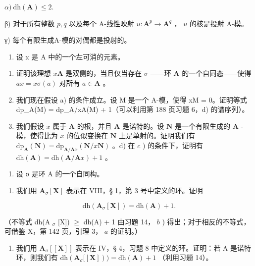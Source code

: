 \(\alpha)\ \mathrm{dh}(\mathbf{A}) \leqslant 2.\)

β) 对于所有整数 \(p, q\) 以及每个 A-线性映射 \(u: \mathbf{A}^p \to \mathbf{A}^q\) ， \(u\) 的核是投射 A-模。

γ) 每个有限生成A-模的对偶都是投射的。

\begin{enumerate}
\def\labelenumi{\arabic{enumi})}
\setcounter{enumi}{13}
\tightlist
\item
  设 x 是 A 中的一个左可消的元素。
\end{enumerate}

\begin{enumerate}
\def\labelenumi{\alph{enumi})}
\item
  证明该理想 \(x\mathbf{A}\) 是双侧的，当且仅当存在 \(\sigma\) ——环 \(\mathbf{A}\) 的一个自同态——使得 \(ax = x\sigma(a)\) 对所有 \(a \in \mathbf{A}\) 。
\item
  我们现在假设 a) 的条件成立。设 M 是一个 A-模，使得 xM = 0。证明等式 dp\_A(M) = dp\_{A/xA}(M) + 1（可以利用第 188 页习题 6，d) 的谱序列）。
\item
  我们假设 \(x\) 属于 \(\mathbf{A}\) 的根，并且 \(\mathbf{A}\) 是诺特的。设 \(\mathbf{N}\) 是一个有限生成的 \(\mathbf{A}\) -模，使得比为 \(x\) 的位似变换在 \(\mathbf{N}\) 上是单射的。证明我们有 \(\mathrm{dp}_{\mathbf{A}}(\mathbf{N}) = \mathrm{dp}_{\mathbf{A}/\mathbf{A}x}(\mathbf{N}/x\mathbf{N})\) 。d) 在 \(c\) ) 的条件下，证明有 \(\mathrm{dh}(\mathbf{A}) = \mathrm{dh}(\mathbf{A}/\mathbf{A}x) + 1\) 。
\end{enumerate}

\begin{enumerate}
\def\labelenumi{\arabic{enumi})}
\setcounter{enumi}{14}
\tightlist
\item
  设 σ 是环 A 的一个自同构。
\end{enumerate}

\begin{enumerate}
\def\labelenumi{\alph{enumi})}
\tightlist
\item
  我们用 \(\mathbf{A}_{\sigma}[\mathbf{X}]\) 表示在 VIII，§ 1，第 3 号中定义的环。证明
\end{enumerate}

\[
\mathrm{dh} (\mathbf {A} _ {\sigma} [ \mathbf {X} ]) = \mathrm{dh} (\mathbf {A}) + 1.
\]

（不等式 dh(A \(_{\sigma}\) {[}X{]}) \(\geqslant\) dh(A) + 1 由习题 14， \(b\) ) 得出；对于相反的不等式，可借鉴 X，第 142 页，引理 3， \(a\) 的证明。）

\begin{enumerate}
\def\labelenumi{\alph{enumi})}
\setcounter{enumi}{1}
\tightlist
\item
  我们用 \(\mathbf{A}_{\sigma}[[\mathbf{X}]]\) 表示在 IV，§ 4，习题 8 中定义的环。证明：若 A 是诺特环，则我们有 \(\mathrm{dh}(\mathbf{A}_{\sigma}[[\mathbf{X}]))=\mathrm{dh}(\mathbf{A})+1\) （利用习题 14）。
\end{enumerate}

